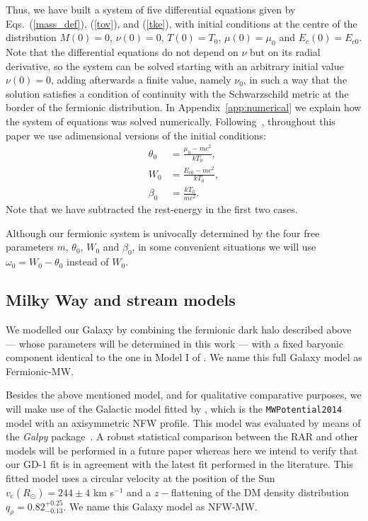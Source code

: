 \documentclass[twocolumn]{aa}
\begin{document}
Thus, we have built a system of five differential equations given 
by Eqs.~(\ref{mass_def}), (\ref{tov}), and (\ref{tke}), with initial conditions
at the centre of the distribution $M(0)=0$, $\nu(0)=0$, $T(0)=T_0$,
$\mu(0)=\mu_0$ and $E_c(0)=E_{c0}$.
Note that the differential equations do not depend on $\nu$ but on its radial
derivative, so the system can be solved starting with an arbitrary initial value $\nu(0)=0$, adding afterwards a finite value, namely $\nu_0$, in such a way that the solution satisfies a condition of continuity with the Schwarzschild metric at the border of the fermionic distribution. In Appendix~\ref{app:numerical} we explain how the system of equations was solved numerically. Following~\cite{arguelles_novel_2018}, throughout this paper we use adimensional versions of the initial conditions: 
\begin{align}
    \theta_0 &= \frac{\mu_0 - mc^2}{kT_0},\nonumber\\
    W_0 &= \frac{E_{c0} - mc^2}{kT_0},\nonumber\\
    \beta_0 &= \frac{kT_0}{mc^2}.\label{rar_params}
\end{align}
Note that we have subtracted the rest-energy in the first two cases.

Although our fermionic system is univocally determined by the four free parameters $m$, $\theta_0$, $W_0$ and $\beta_0$, in some convenient situations we will use $\omega_0=W_0-\theta_0$ instead of $W_0$.




\subsection{Milky Way and stream models}
\label{sec:MW_stream_models}

We modelled our Galaxy by combining the fermionic dark halo described above --- whose parameters will be determined in this work --- with a fixed baryonic component identical to the one in Model I of \citet{2017A&A...598A..66P}. We name this full Galaxy model as Fermionic-MW.

Besides the above mentioned model, and for qualitative comparative purposes, we will make use of the Galactic model fitted by \citet{2019MNRAS.486.2995M}, which is the {\texttt{MWPotential2014}} model with an axisymmetric NFW profile. This model was evaluated by means of the {\it Galpy} package~\citep{2015ApJS..216...29B}. A robust statistical comparison between the RAR and other models will be performed in a future paper whereas here we intend to verify that our GD-1 fit is in agreement with the latest fit performed in the literature. This fitted model uses a circular velocity at the position of the Sun $v_\mathrm{c}(R_\odot)=244 \pm 4$ km s$^{-1}$ and a $z-$flattening of the DM density distribution  $q_\rho=0.82^{+0.25}_{-0.13}$. We name this Galaxy model as NFW-MW.
\end{document}
